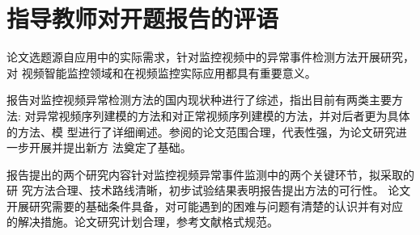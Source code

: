 



\section{指导教师对开题报告的评语}
\begin{mdframed}[everyline=true]
   \indent
   
   论文选题源自应用中的实际需求，针对监控视频中的异常事件检测方法开展研究，对 视频智能监控领域和在视频监控实际应用都具有重要意义。
   
   报告对监控视频异常检测方法的国内现状种进行了综述，指出目前有两类主要方法: 对异常视频序列建模的方法和对正常视频序列建模的方法，并对后者更为具体的方法、模 型进行了详细阐述。参阅的论文范围合理，代表性强，为论文研究进一步开展并提出新方 法奠定了基础。
   
   报告提出的两个研究内容针对监控视频异常事件监测中的两个关键环节，拟采取的研 究方法合理、技术路线清晰，初步试验结果表明报告提出方法的可行性。
论文开展研究需要的基础条件具备，对可能遇到的困难与问题有清楚的认识并有对应 的解决措施。论文研究计划合理，参考文献格式规范。
\\[8 cm]
\end{mdframed}

